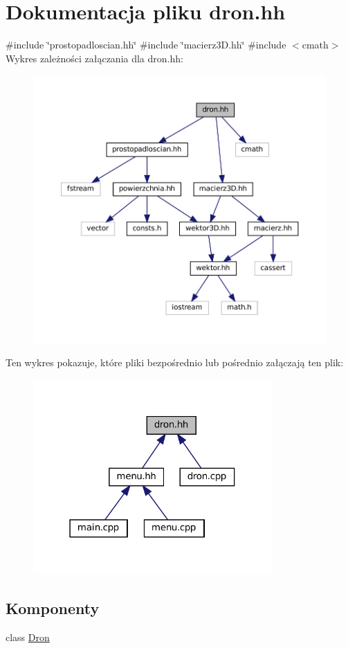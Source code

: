\hypertarget{dron_8hh}{}\section{Dokumentacja pliku dron.\+hh}
\label{dron_8hh}
{\ttfamily \#include \char`\"{}prostopadloscian.\+hh\char`\"{}}\newline
{\ttfamily \#include \char`\"{}macierz3\+D.\+hh\char`\"{}}\newline
{\ttfamily \#include $<$cmath$>$}\newline
Wykres zależności załączania dla dron.\+hh\+:\nopagebreak
\begin{figure}[H]
\begin{center}
\leavevmode
\includegraphics[width=350pt]{dron_8hh__incl}
\end{center}
\end{figure}
Ten wykres pokazuje, które pliki bezpośrednio lub pośrednio załączają ten plik\+:
\nopagebreak
\begin{figure}[H]
\begin{center}
\leavevmode
\includegraphics[width=259pt]{dron_8hh__dep__incl}
\end{center}
\end{figure}
\subsection*{Komponenty}
\begin{DoxyCompactItemize}
\item 
class \mbox{\hyperlink{class_dron}{Dron}}
\end{DoxyCompactItemize}
